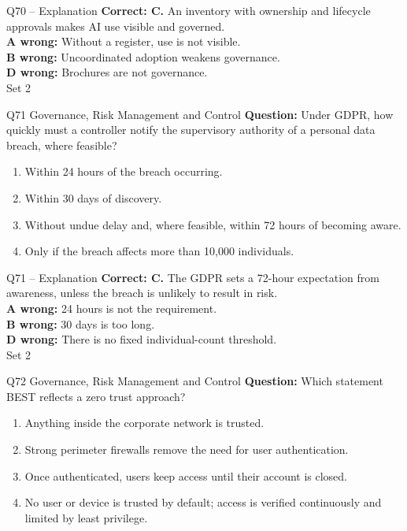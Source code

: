 \documentclass[aspectratio=169,10pt]{beamer}
\begin{document}
\begin{frame}[t]{Q70 -- Explanation}
	\footnotesize
	\textbf{Correct: C.} An inventory with ownership and lifecycle approvals makes AI use visible and governed. \\[5pt]
\textbf{A wrong:} Without a register, use is not visible. \\[3pt]
\textbf{B wrong:} Uncoordinated adoption weakens governance. \\[3pt]
\textbf{D wrong:} Brochures are not governance. \\[3pt]
	\vfill {\tiny Set 2}
\end{frame}

\begin{frame}[t]{Q71 \hfill {\scriptsize Governance, Risk Management and Control}}
	\small
	\textbf{Question:} Under GDPR, how quickly must a controller notify the supervisory authority of a personal data breach, where feasible?
	\begin{enumerate}[label=\Alph*.,itemsep=1pt,topsep=3pt]
			\item Within 24 hours of the breach occurring.
			\item Within 30 days of discovery.
			\item Without undue delay and, where feasible, within 72 hours of becoming aware.
			\item Only if the breach affects more than 10,000 individuals.
	\end{enumerate}
\end{frame}

\begin{frame}[t]{Q71 -- Explanation}
	\footnotesize
	\textbf{Correct: C.} The GDPR sets a 72-hour expectation from awareness, unless the breach is unlikely to result in risk. \\[5pt]
\textbf{A wrong:} 24 hours is not the requirement. \\[3pt]
\textbf{B wrong:} 30 days is too long. \\[3pt]
\textbf{D wrong:} There is no fixed individual-count threshold. \\[3pt]
	\vfill {\tiny Set 2}
\end{frame}

\begin{frame}[t]{Q72 \hfill {\scriptsize Governance, Risk Management and Control}}
	\small
	\textbf{Question:} Which statement BEST reflects a zero trust approach?
	\begin{enumerate}[label=\Alph*.,itemsep=1pt,topsep=3pt]
			\item Anything inside the corporate network is trusted.
			\item Strong perimeter firewalls remove the need for user authentication.
			\item Once authenticated, users keep access until their account is closed.
			\item No user or device is trusted by default; access is verified continuously and limited by least privilege.
	\end{enumerate}
\end{frame}
\end{document}
